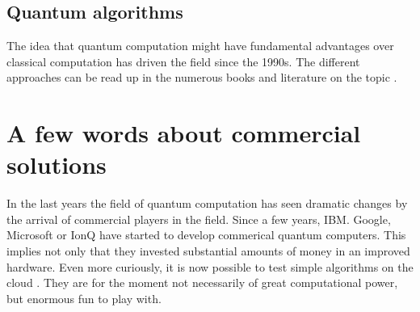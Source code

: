 \documentclass[10pt]{article}
\let\cite\citep
\providecommand\citep{\cite}
\begin{document}
\subsection{Quantum algorithms}
The idea that quantum computation might have fundamental advantages over classical computation has driven the field since the 1990s. The different approaches can be read up in the numerous books and literature on the topic \cite{beginners}.


\section{A few words about commercial solutions}
In the last years the field of quantum computation has seen dramatic changes by the arrival of commercial players in the field. Since a few years, IBM. Google, Microsoft or IonQ have started to develop commerical quantum computers. This implies not only that they invested substantial amounts of money in an improved hardware. Even more curiously, it is now possible to test simple algorithms on the cloud \cite{ai}. They are for the moment not necessarily of great computational power, but enormous fun to play with.

\FloatBarrier


\end{document}
